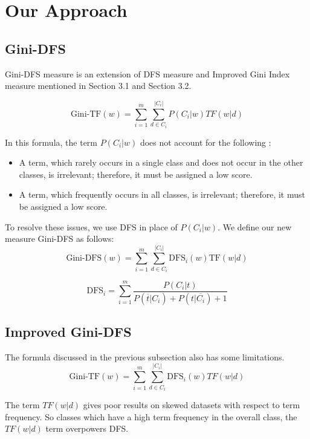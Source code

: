 \documentclass[a4paper, 14pt]{article}
\begin{document}
\section{Our Approach}
\begin{justify}

\subsection{Gini-DFS}
\begin{justify}
Gini-DFS measure is an extension of DFS measure and Improved Gini Index measure mentioned in Section 3.1 and Section 3.2.

\[\text{Gini-TF}(w) = \sum_{i=1}^{m}{\sum_{d \in C_{i}}^{|C_i|}{P(C_{i}|w)TF(w|d)}}\]

In this formula, the term $P(C_{i}|w)$ does not account for the following : 
\begin{itemize}

\item A term, which rarely occurs in a single class and does not occur in the other classes, is irrelevant; therefore, it must be assigned a low score.
 \item A term, which frequently occurs in all classes, is irrelevant; therefore, it must be assigned a low score. 
 \end{itemize}
 
 \justify
 To resolve these issues, we use DFS in place of $P(C_{i}|w)$. We define our new measure Gini-DFS as follows:
    \[\text{Gini-DFS}(w) = \sum_{i=1}^{m}{\sum_{d \in C_{i}}^{|C_i|}{\text{DFS}_{i}(w)\text{TF}(w|d)}}\]

\[
\text{DFS}_{i} =  \sum_{i=1}^{m}{\dfrac{P(C_{i}|t)}{P{(\overline{t}|C_{i})} + 
P{(t|\overline{C_{i}})} + 1
}}
\]
\end{justify}
 
\subsection{Improved Gini-DFS}
\begin{justify}
    
The formula discussed in the previous subsection also has some limitations. 
\[\text{Gini-TF}(w) = \sum_{i=1}^{m}{\sum_{d \in C_{i}}^{|C_i|}{\text{DFS}_{i}(w)TF(w|d)}}\]

\justify
The term $TF(w|d)$ gives poor results on skewed datasets with respect to term frequency. So classes which have a high term frequency in the overall class, the $TF(w|d)$ term overpowers DFS.


\end{justify}
\end{justify}
\end{document}
